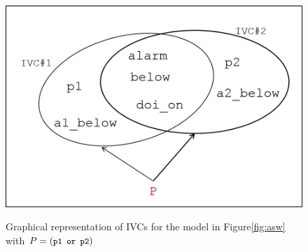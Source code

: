 \begin{figure}[t]
 \centering
  \includegraphics[width=0.65\columnwidth]{figs/ivcs.png}
  \label{fig:ivcs}
  \vspace{-0.1in}
  \caption{Graphical representation of IVCs for the model in Figure\ref{fig:asw} with  $P = (\small{\texttt{p1 or p2}})$}
\end{figure}





